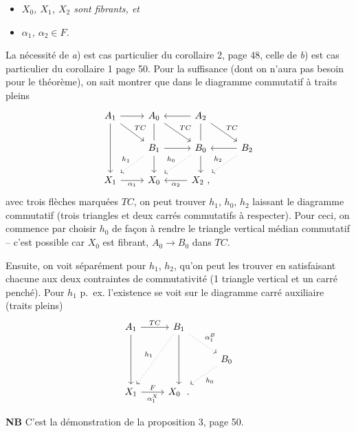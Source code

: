 \documentclass[11pt]{article}
\newcommand{\printedpage}[1]{\marginpar{\footnotesize p.~#1}}
\newcommand{\msp}[1]{\marginpar{\footnotesize [#1]}}
\begin{document}
\begin{itemize}[leftmargin=3em]
\item[a)] \textit{$X_0$, $X_1$, $X_2$ sont fibrants, et}
\item[b)] \textit{$\alpha_1$, $\alpha_2 \in F$.}
\end{itemize}

La nécessité de \textit{a}) est cas particulier du corollaire 2, page 48, celle de \textit{b}) est cas particulier du corollaire 1 page 50. Pour la suffisance (dont on n'aura pas besoin pour le théorème), on sait montrer que dans le diagramme commutatif à traits pleins
\[
\begin{tikzcd}
A_1 \arrow[r] \arrow[dr, "TC"] \arrow[dd] & A_0 \arrow[dr, "TC"] \arrow[d, dash] & A_2 \arrow[l] \arrow[dr, "TC"] \arrow[d, dash] & \\
 & B_1 \arrow[r] \arrow[dl, dotted, "h_1"'] \arrow[d] & B_0 \arrow[dl, dotted, "h_0"'] \arrow[d] & B_2 \arrow[l] \arrow[dl, dotted, "h_2"'] \\
X_1 \arrow[r, "\alpha_1"'] & X_0 & X_2 \ , \arrow[l, "\alpha_2"] &
\end{tikzcd}
\]
avec trois flèches marquées $TC$, on peut trouver $h_1$, $h_0$, $h_2$ laissant le diagramme commutatif (trois triangles et deux carrés commutatifs à respecter). Pour ceci, on commence par choisir $h_0$ de façon à rendre le triangle vertical médian commutatif -- c'est possible car $X_0$ est fibrant, $A_0 \longrightarrow B_0$ dans $TC$.

\printedpage{36}
\msp{page 64}

Ensuite, on voit séparément pour $h_1$, $h_2$, qu'on peut les trouver en satisfaisant chacune aux deux contraintes de commutativité (1 triangle vertical et un carré penché). Pour $h_1$ p.~ex. l'existence se voit sur le diagramme carré auxiliaire (traits pleins)
\[
\begin{tikzcd}
A_1 \arrow[r, "TC"] \arrow[dd] & B_1 \arrow[dd] \arrow[ddl, dotted, "h_1"'] \arrow[dr, dotted, "\alpha_1^B"] & \\
 & & B_0 \arrow[dl, dotted, "h_0"] \\
X_1 \arrow[r, "F", "\alpha_1^X"'] & X_0 \ \ . &
\end{tikzcd}
\]

\textbf{NB} C'est la démonstration de la proposition 3, page 50.
\end{document}
